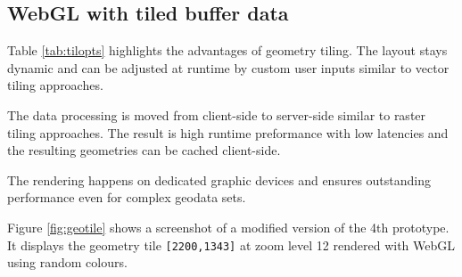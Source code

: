     \subsection{WebGL with tiled buffer data}
      Table \ref{tab:tilopts} highlights the advantages of geometry tiling. The layout stays dynamic and can be adjusted at runtime by custom user inputs similar to vector tiling approaches.\par
      The data processing is moved from client-side to server-side similar to raster tiling approaches. The result is high runtime preformance with low latencies and the resulting geometries can be cached client-side.\par
      The rendering happens on dedicated graphic devices and ensures outstanding performance even for complex geodata sets.

      Figure \ref{fig:geotile} shows a screenshot of a modified version of the 4th prototype. It displays the geometry tile \texttt{[2200,1343]} at zoom level 12 rendered with WebGL using random colours.

